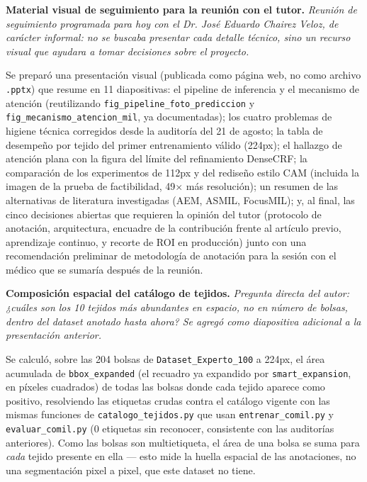 \documentclass[12pt,letterpaper]{report}
\newcommand{\entrada}[2]{%
    \vspace{0.6em}
    \noindent\textbf{#1.} \textit{#2}
    \vspace{0.3em}
    \par
}
\begin{document}
\entrada{Material visual de seguimiento para la reunión con el tutor}{Reunión de seguimiento
programada para hoy con el Dr. José Eduardo Chairez Veloz, de carácter informal: no se buscaba
presentar cada detalle técnico, sino un recurso visual que ayudara a tomar decisiones sobre el
proyecto.}

Se preparó una presentación visual (publicada como página web, no como archivo \texttt{.pptx}) que
resume en 11 diapositivas: el pipeline de inferencia y el mecanismo de atención (reutilizando
\texttt{fig\_pipeline\_foto\_prediccion} y \texttt{fig\_mecanismo\_atencion\_mil}, ya documentadas);
los cuatro problemas de higiene técnica corregidos desde la auditoría del 21 de agosto; la tabla de
desempeño por tejido del primer entrenamiento válido (224px); el hallazgo de atención plana con la
figura del límite del refinamiento DenseCRF; la comparación de los experimentos de 112px y del
rediseño estilo CAM (incluida la imagen de la prueba de factibilidad, 49$\times$ más resolución); un
resumen de las alternativas de literatura investigadas (AEM, ASMIL, FocusMIL); y, al final, las cinco
decisiones abiertas que requieren la opinión del tutor (protocolo de anotación, arquitectura,
encuadre de la contribución frente al artículo previo, aprendizaje continuo, y recorte de ROI en
producción) junto con una recomendación preliminar de metodología de anotación para la sesión con el
médico que se sumaría después de la reunión.

\entrada{Composición espacial del catálogo de tejidos}{Pregunta directa del autor: ¿cuáles son los
10 tejidos más abundantes \emph{en espacio}, no en número de bolsas, dentro del dataset anotado
hasta ahora? Se agregó como diapositiva adicional a la presentación anterior.}

Se calculó, sobre las 204 bolsas de \texttt{Dataset\_Experto\_100} a 224px, el área acumulada de
\texttt{bbox\_expanded} (el recuadro ya expandido por \texttt{smart\_expansion}, en p\'ixeles
cuadrados) de todas las bolsas donde cada tejido aparece como positivo, resolviendo las etiquetas
crudas contra el catálogo vigente con las mismas funciones de \texttt{catalogo\_tejidos.py} que usan
\texttt{entrenar\_comil.py} y \texttt{evaluar\_comil.py} (0 etiquetas sin reconocer, consistente con
las auditorías anteriores). Como las bolsas son multietiqueta, el área de una bolsa se suma para
\emph{cada} tejido presente en ella --- esto mide la huella espacial de las anotaciones, no una
segmentación pixel a pixel, que este dataset no tiene.
\end{document}
